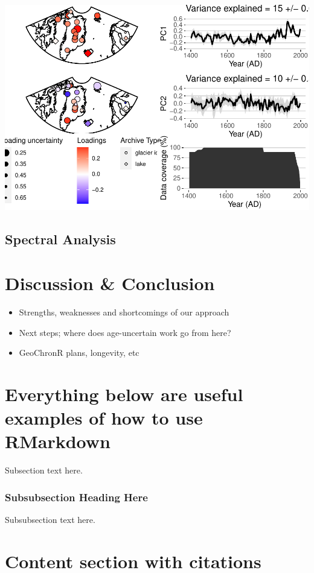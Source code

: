 \documentclass[gc, manuscript]{copernicus}
\begin{document}
\includegraphics{geoChronR-paper_files/figure-latex/unnamed-chunk-13-1.pdf}

\subsection{Spectral Analysis}

\section{Discussion \& Conclusion}

\begin{itemize}
\item
  Strengths, weaknesses and shortcomings of our approach
\item
  Next steps; where does age-uncertain work go from here?
\item
  GeoChronR plans, longevity, etc
\end{itemize}

\section{Everything below are useful examples of how to use RMarkdown}

Subsection text here.

\subsubsection{Subsubsection Heading Here}

Subsubsection text here.

\section{Content section with citations}
\end{document}
